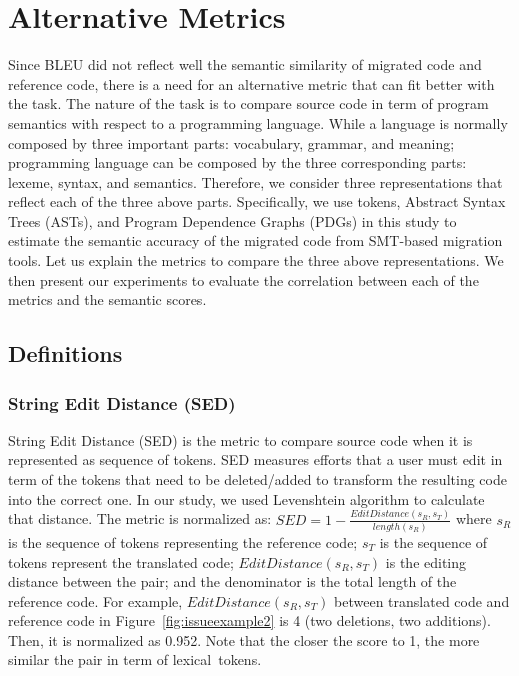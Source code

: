 \section{Alternative Metrics}
\label{sec:alternatives}
Since BLEU did not reflect well the semantic similarity of migrated
code and reference code, there is a need for an alternative metric
that can fit better with the task. The nature of the task is to
compare source code in term of program semantics with respect to a
programming language.
%
While a language is normally composed by three important parts:
vocabulary, grammar, and meaning; programming language can be composed
by the three corresponding parts: lexeme, syntax, and
semantics. 
%
Therefore, we consider three representations that reflect each of the
three above parts. Specifically, we use tokens, Abstract Syntax Trees
(ASTs), and Program Dependence Graphs (PDGs) in this study to estimate
the semantic accuracy of the migrated code from SMT-based migration
tools.
%
Let us explain the metrics to compare the three above representations.
%
We then present our experiments to evaluate the correlation between
each of the metrics and the semantic scores.


\subsection{Definitions}

\subsubsection{\textbf{String Edit Distance (SED)}}
String Edit Distance (SED) is the metric to compare source code when
it is represented as sequence of tokens. SED measures efforts that a
user must edit in term of the tokens that need to be deleted/added to
transform the resulting code into the correct one. In our study, we
used Levenshtein algorithm to calculate that distance. The metric is
normalized as: $SED = 1 - \frac{EditDistance\left(s_R,
  s_T\right)}{length\left(s_R\right)}$ where $s_R$ is the sequence of
tokens representing the reference code; $s_T$ is the sequence of
tokens represent the translated code; $EditDistance\left(s_R,
s_T\right)$ is the editing distance between the pair; and the
denominator is the total length of the reference code. For example,
$EditDistance\left(s_R, s_T\right)$ between translated code and
reference code in Figure~\ref{fig:issueexample2} is 4 (two deletions,
two additions). Then, it is normalized as 0.952. Note that the closer
the score to 1, the more similar the pair in term of lexical~tokens.




 

